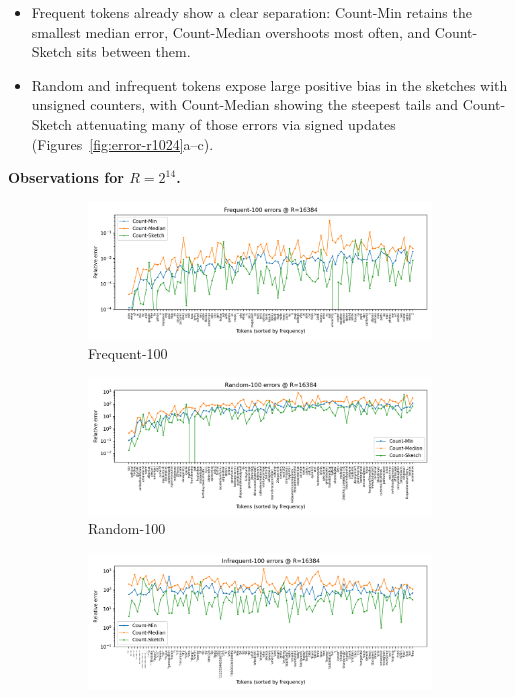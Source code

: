 \documentclass[11pt]{article}
\begin{document}
\begin{itemize}
  \item Frequent tokens already show a clear separation: Count-Min retains the smallest median error, Count-Median overshoots most often, and Count-Sketch sits between them.
  \item Random and infrequent tokens expose large positive bias in the sketches with unsigned counters, with Count-Median showing the steepest tails and Count-Sketch attenuating many of those errors via signed updates (Figures~\ref{fig:error-r1024}a--c).
\end{itemize}

\newpage

\noindent\textbf{Observations for $R=2^{14}$.}

\begin{figure}[H]
  \centering
  \begin{subfigure}[t]{0.32\linewidth}
    \centering
    \includegraphics[width=\linewidth]{../outputs/a2/errors_R16384_Frequent_100.png}
    \caption{Frequent-100}
  \end{subfigure}
  \hfill
  \begin{subfigure}[t]{0.32\linewidth}
    \centering
    \includegraphics[width=\linewidth]{../outputs/a2/errors_R16384_Random_100.png}
    \caption{Random-100}
  \end{subfigure}
  \hfill
  \begin{subfigure}[t]{0.32\linewidth}
    \centering
    \includegraphics[width=\linewidth]{../outputs/a2/errors_R16384_Infrequent_100.png}

\end{subfigure}
\end{figure}
\end{document}
